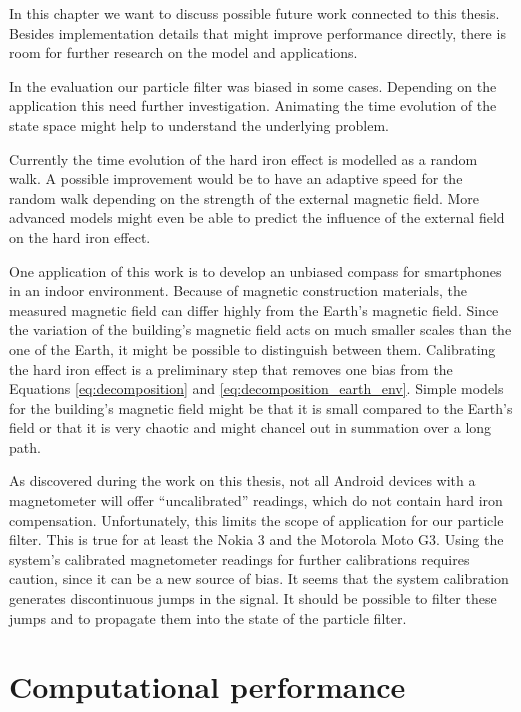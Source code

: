 
In this chapter we want to discuss possible future work connected to this thesis. Besides implementation details that might improve performance directly, there is room for further research on the model and applications.

In the evaluation our particle filter was biased in some cases. Depending on the application this need further investigation. Animating the time evolution of the state space might help to understand the underlying problem.

Currently the time evolution of the hard iron effect is modelled as a random walk. A possible improvement would be to have an adaptive speed for the random walk depending on the strength of the external magnetic field. More advanced models might even be able to predict the influence of the external field on the hard iron effect.

One application of this work is to develop an unbiased compass for smartphones in an indoor environment. Because of magnetic construction materials, the measured magnetic field can differ highly from the Earth's magnetic field. Since the variation of the building's magnetic field acts on much smaller scales than the one of the Earth, it might be possible to distinguish between them. Calibrating the hard iron effect is a preliminary step that removes one bias from the Equations \ref{eq:decomposition} and \ref{eq:decomposition_earth_env}. Simple models for the building's magnetic field might be that it is small compared to the Earth's field or that it is very chaotic and might chancel out in summation over a long path.

As discovered during the work on this thesis, not all Android devices with a magnetometer will offer ``uncalibrated'' readings, which do not contain hard iron compensation. Unfortunately, this limits the scope of application for our particle filter. This is true for at least the Nokia 3 and the Motorola Moto G3. Using the system's calibrated magnetometer readings for further calibrations requires caution, since it can be a new source of bias. It seems that the system calibration generates discontinuous jumps in the signal. It should be possible to filter these jumps and to propagate them into the state of the particle filter.

\section{Computational performance}

